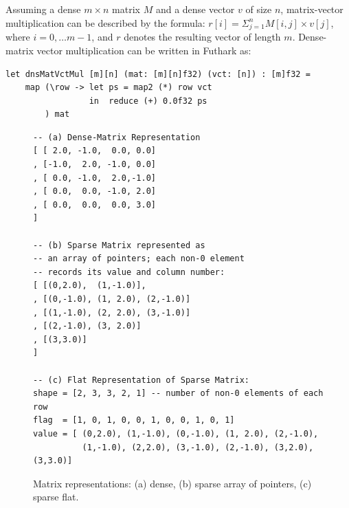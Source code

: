 \documentclass[acmsmall,review]{acmart}\settopmatter{printfolios=true,printccs=false,printacmref=false}
\begin{document}
Assuming a dense $m\times n$ matrix $M$ and a dense vector $v$ of 
size $n$, matrix-vector multiplication can be described by the
formula: $r[i] = \Sigma_{j=1}^n M[i,j] \times v[j]$, where 
$i=0,\ldots m-1$, and $r$ denotes the resulting vector of
length $m$. Dense-matrix vector multiplication can be written
in Futhark as:
\begin{lstlisting}[mathescape=true]
let dnsMatVctMul [m][n] (mat: [m][n]f32) (vct: [n]) : [m]f32 =
    map (\row -> let ps = map2 (*) row vct
                 in  reduce (+) 0.0f32 ps
        ) mat
\end{lstlisting}\vspace{-2ex}


\begin{figure}
\begin{lstlisting}[mathescape=true]
-- (a) Dense-Matrix Representation
[ [ 2.0, -1.0,  0.0, 0.0]              
, [-1.0,  2.0, -1.0, 0.0]
, [ 0.0, -1.0,  2.0,-1.0]
, [ 0.0,  0.0, -1.0, 2.0]
, [ 0.0,  0.0,  0.0, 3.0]
]

-- (b) Sparse Matrix represented as 
-- an array of pointers; each non-0 element 
-- records its value and column number:
[ [(0,2.0),  (1,-1.0)],
, [(0,-1.0), (1, 2.0), (2,-1.0)]
, [(1,-1.0), (2, 2.0), (3,-1.0)]
, [(2,-1.0), (3, 2.0)]
, [(3,3.0)]
]

-- (c) Flat Representation of Sparse Matrix:
shape = [2, 3, 3, 2, 1] -- number of non-0 elements of each row
flag  = [1, 0, 1, 0, 0, 1, 0, 0, 1, 0, 1]
value = [ (0,2.0), (1,-1.0), (0,-1.0), (1, 2.0), (2,-1.0),
          (1,-1.0), (2,2.0), (3,-1.0), (2,-1.0), (3,2.0), (3,3.0)]
\end{lstlisting}\vspace{-4ex}
\caption{ Matrix representations: (a) dense, (b) sparse array of pointers, (c) sparse flat.}
\label{fig:mat-reps}
\end{figure}
\end{document}
